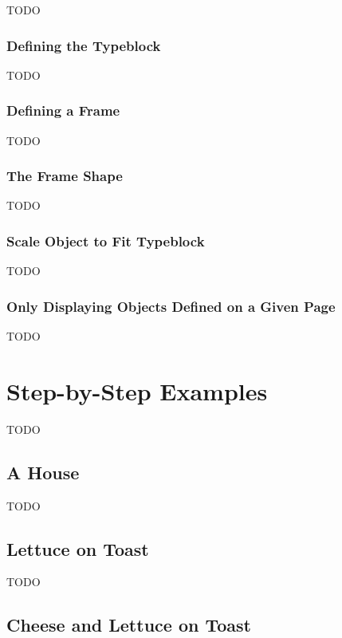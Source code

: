 TODO


\subsection{Defining the Typeblock}\label{sec:typeblock}

TODO


\subsection{Defining a Frame}\label{sec:framedef}

TODO


\subsection{The Frame Shape}\label{sec:frameshape}

TODO


\subsection{Scale Object to Fit Typeblock}\label{sec:scaletotypeblock}

TODO


\subsection{Only Displaying Objects Defined on a Given Page}\label{sec:displaypage}

TODO


\chapter{Step-by-Step Examples}\label{sec:tutorials}

TODO


\section{A House}\label{sec:houseexample}

TODO


\section{Lettuce on Toast}\label{sec:toastexample}

TODO


\section{Cheese and Lettuce on Toast}\label{sec:cheeseexample}

